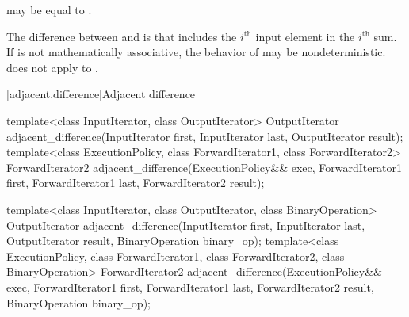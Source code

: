 \begin{itemdescr}
\pnum
\remarks
{} may be equal to .

\pnum
\begin{note}
The difference between  and
 is that 
includes the $i^\text{th}$ input element in the $i^\text{th}$ sum. If  is not
mathematically associative, the behavior of 
may be nondeterministic.  does not apply
 to .
\end{note}
\end{itemdescr}

[adjacent.difference]{Adjacent difference}

%
\begin{itemdecl}
template<class InputIterator, class OutputIterator>
  OutputIterator
    adjacent_difference(InputIterator first, InputIterator last, OutputIterator result);
template<class ExecutionPolicy, class ForwardIterator1, class ForwardIterator2>
  ForwardIterator2
    adjacent_difference(ExecutionPolicy&& exec,
                        ForwardIterator1 first, ForwardIterator1 last, ForwardIterator2 result);

template<class InputIterator, class OutputIterator, class BinaryOperation>
  OutputIterator
    adjacent_difference(InputIterator first, InputIterator last,
                        OutputIterator result, BinaryOperation binary_op);
template<class ExecutionPolicy, class ForwardIterator1, class ForwardIterator2,
         class BinaryOperation>
  ForwardIterator2
    adjacent_difference(ExecutionPolicy&& exec,
                        ForwardIterator1 first, ForwardIterator1 last,
                        ForwardIterator2 result, BinaryOperation binary_op);
\end{itemdecl}

